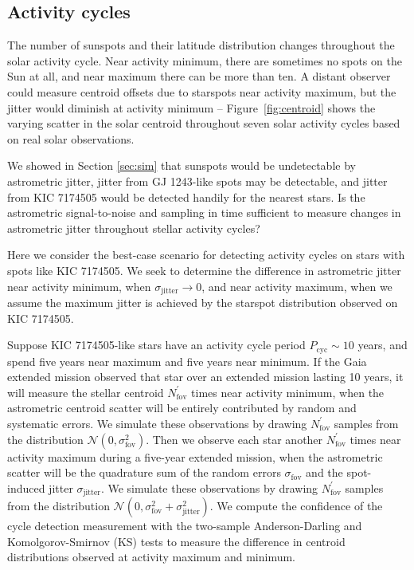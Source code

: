 \subsection{Activity cycles}

The number of sunspots and their latitude distribution changes throughout the solar activity cycle. Near activity minimum, there are sometimes no spots on the Sun at all, and near maximum there can be more than ten. A distant observer could measure centroid offsets due to starspots near activity maximum, but the jitter would diminish at activity minimum -- Figure~\ref{fig:centroid} shows the varying scatter in the solar centroid throughout seven solar activity cycles based on real solar observations. 

We showed in Section \ref{sec:sim} that sunspots would be undetectable by astrometric jitter, jitter from GJ 1243-like spots may be detectable, and jitter from KIC 7174505 would be detected handily for the nearest stars. Is the astrometric signal-to-noise and sampling in time sufficient to measure changes in astrometric jitter throughout stellar activity cycles? 

Here we consider the best-case scenario for detecting activity cycles on stars with spots like KIC 7174505. We seek to determine the difference in astrometric jitter near activity minimum, when $\sigma_{\mathrm{jitter}} \rightarrow 0$, and near activity maximum, when we assume the maximum jitter is achieved by the starspot distribution observed on KIC 7174505. 

Suppose KIC 7174505-like stars have an activity cycle period $P_{\mathrm{cyc}} \sim 10$ years, and spend five years near maximum and five years near minimum. If the Gaia extended mission observed that star over an extended mission lasting 10 years, it will measure the stellar centroid $N^\prime_{\mathrm{fov}}$ times near activity minimum, when the astrometric centroid scatter will be entirely contributed by random and systematic errors. We simulate these observations by drawing $N^\prime_{\mathrm{fov}}$ samples from the distribution $\mathcal{N}(0, \sigma_{\mathrm{fov}}^2)$. Then we observe each star another $N^\prime_{\mathrm{fov}}$ times near activity maximum during a five-year extended mission, when the astrometric scatter will be the quadrature sum of the random errors $\sigma_{\mathrm{fov}}$ and the spot-induced jitter $\sigma_{\mathrm{jitter}}$. We simulate these observations by drawing $N^\prime_{\mathrm{fov}}$ samples from the distribution $\mathcal{N}(0, \sigma_{\mathrm{fov}}^2 + \sigma_{\mathrm{jitter}}^2)$. We compute the confidence of the cycle detection measurement with the two-sample Anderson-Darling and Komolgorov-Smirnov (KS) tests to measure the difference in centroid distributions observed at activity maximum and minimum.

